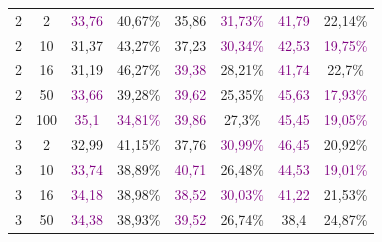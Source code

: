 \begin{table}[ht]
\begin{tabular}{cc|cc|cc|cc}
        {2}                           & {2}     & \textcolor{purple}{33,76}           & {40,67\%}                           & {35,86}                                  & \textcolor{purple}{31,73\%} & \textcolor{purple}{41,79} & {22,14\%}                   \\
        {2}                           & {10}    & {31,37}                             & {43,27\%}                           & {37,23}                                  & \textcolor{purple}{30,34\%} & \textcolor{purple}{42,53} & \textcolor{purple}{19,75\%} \\
        {2}                           & {16}    & {31,19}                             & {46,27\%}                           & \textcolor{purple}{39,38}                & {28,21\%}                   & \textcolor{purple}{41,74} & {22,7\%}                    \\
        {2}                           & {50}    & \textcolor{purple}{33,66}           & {39,28\%}                           & \textcolor{purple}{39,62}                & {25,35\%}                   & \textcolor{purple}{45,63} & \textcolor{purple}{17,93\%} \\
        {2}                           & {100}   & \textcolor{purple}{35,1}            & \textcolor{purple}{34,81\%}         & \textcolor{purple}{39,86}                & {27,3\%}                    & \textcolor{purple}{45,45} & \textcolor{purple}{19,05\%} \\
        {3}                           & {2}     & {32,99}                             & {41,15\%}                           & {37,76}                                  & \textcolor{purple}{30,99\%} & \textcolor{purple}{46,45} & {20,92\%}                   \\
        {3}                           & {10}    & \textcolor{purple}{33,74}           & {38,89\%}                           & \textcolor{purple}{40,71}                & {26,48\%}                   & \textcolor{purple}{44,53} & \textcolor{purple}{19,01\%} \\
        {3}                           & {16}    & \textcolor{purple}{34,18}           & {38,98\%}                           & \textcolor{purple}{38,52}                & \textcolor{purple}{30,03\%} & \textcolor{purple}{41,22} & {21,53\%}                   \\
        {3}                           & {50}    & \textcolor{purple}{34,38}           & {38,93\%}                           & \textcolor{purple}{39,52}                & {26,74\%}                   & {38,4}                    & {24,87\%}                   \\

\end{tabular}
\end{table}
